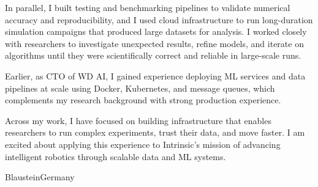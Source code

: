 \documentclass[11pt,a4paper,sans]{moderncv}        %
\begin{document}
In parallel, I built testing and benchmarking pipelines to validate numerical accuracy and reproducibility, and I used cloud infrastructure to run long-duration simulation campaigns that produced large datasets for analysis. I worked closely with researchers to investigate unexpected results, refine models, and iterate on algorithms until they were scientifically correct and reliable in large-scale runs.

Earlier, as CTO of WD AI, I gained experience deploying ML services and data pipelines at scale using Docker, Kubernetes, and message queues, which complements my research background with strong production experience.

Across my work, I have focused on building infrastructure that enables researchers to run complex experiments, trust their data, and move faster. I am excited about applying this experience to Intrinsic’s mission of advancing intelligent robotics through scalable data and ML systems.
	
	\title{}
	\address{Erhard-Grözinger-Straße, 75}{Blaustein}{Germany}
	\makeletterclosing
	\name{}{}
\end{document}
